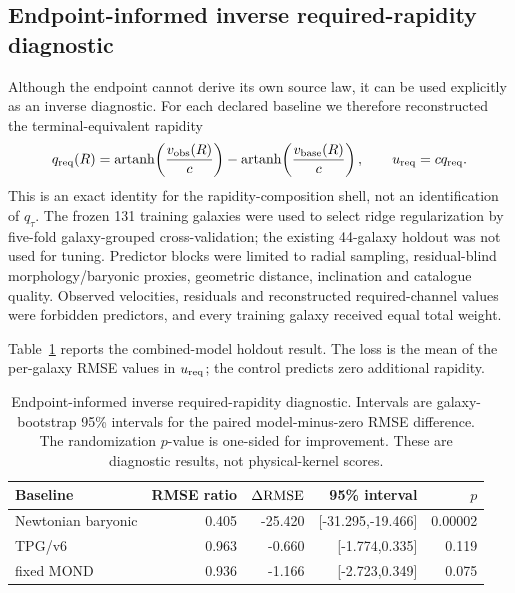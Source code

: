 \documentclass[11pt]{article}
\begin{document}
\subsection{Endpoint-informed inverse required-rapidity diagnostic}

Although the endpoint cannot derive its own source law, it can be used
explicitly as an inverse diagnostic.  For each declared baseline we therefore
reconstructed the terminal-equivalent rapidity
\begin{equation}
 q_{\rm req}(R)
 =
 \operatorname{artanh}\!\left(\frac{v_{\rm obs}(R)}{c}\right)
 -
 \operatorname{artanh}\!\left(\frac{v_{\rm base}(R)}{c}\right),
 \qquad
 u_{\rm req}=c q_{\rm req}.
 \label{eq:inverse-required-rapidity}
\end{equation}
This is an exact identity for the rapidity-composition shell, not an
identification of \(q_\tau\).  The frozen 131 training galaxies were used to
select ridge regularization by five-fold galaxy-grouped cross-validation;
the existing 44-galaxy holdout was not used for tuning.  Predictor blocks were
limited to radial sampling, residual-blind morphology/baryonic proxies,
geometric distance, inclination and catalogue quality.  Observed velocities,
residuals and reconstructed required-channel values were forbidden
predictors, and every training galaxy received equal total weight.

Table~\ref{tab:inverse-rapidity} reports the combined-model holdout result.
The loss is the mean of the per-galaxy RMSE values in \(u_{\rm req}\); the
control predicts zero additional rapidity.

\begin{table}[htbp]
\centering
\caption{Endpoint-informed inverse required-rapidity diagnostic.  Intervals
are galaxy-bootstrap 95\% intervals for the paired model-minus-zero RMSE
difference.  The randomization \(p\)-value is one-sided for improvement.
These are diagnostic results, not physical-kernel scores.}
\label{tab:inverse-rapidity}
\begin{tabular}{lrrrr}
\hline
Baseline & RMSE ratio & \(\Delta{\rm RMSE}\) & 95\% interval & \(p\)\\
\hline
Newtonian baryonic & 0.405 & -25.420 & [-31.295,-19.466] & 0.00002\\
TPG/v6 & 0.963 & -0.660 & [-1.774,0.335] & 0.119\\
fixed MOND & 0.936 & -1.166 & [-2.723,0.349] & 0.075\\
\hline
\end{tabular}
\end{table}
\end{document}
